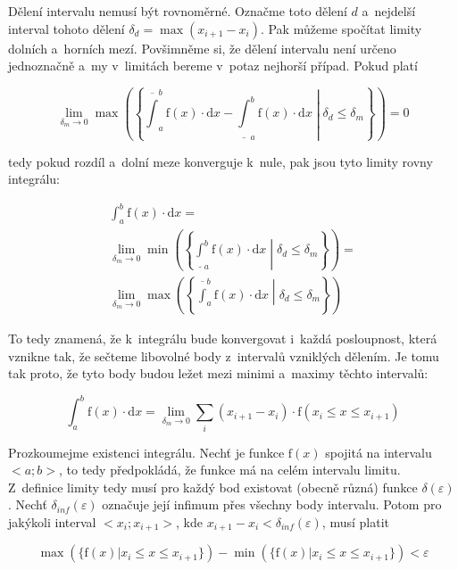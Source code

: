 Dělení intervalu nemusí být rovnoměrné. Označme toto dělení \(d\) a~nejdelší interval tohoto dělení \(\delta_d = \max(x_{i+1} - x_i)\). Pak můžeme spočítat limity dolních a~horních mezí. Povšimněme si, že dělení intervalu není určeno jednoznačně a~my v~limitách bereme v~potaz nejhorší případ. Pokud platí

\begin{equation}
\lim_{\delta_m \to 0} \max \left(\left\{\overline{\int}_a^b \mathrm{f}(x) \cdot \mathrm{d}x - \underline{\int}_a^b \mathrm{f}(x) \cdot \mathrm{d}x \middle| \delta_d \leq \delta_m \right\}\right) = 0
\end{equation}

tedy pokud rozdíl a~dolní meze konverguje k~nule, pak jsou tyto limity rovny integrálu:

\begin{equation}
\begin{split}
\int_a^b \mathrm{f}(x) \cdot \mathrm{d}x = \\
\lim_{\delta_m \to 0} \min \left(\left\{\underline{\int}_a^b \mathrm{f}(x) \cdot \mathrm{d}x \middle| \delta_d \leq \delta_m \right\}\right) = \\
\lim_{\delta_m \to 0} \max \left(\left\{\overline{\int}_a^b \mathrm{f}(x) \cdot \mathrm{d}x \middle| \delta_d \leq \delta_m \right\}\right)
\end{split}
\end{equation}

To tedy znamená, že k~integrálu bude konvergovat i~každá posloupnost, která vznikne tak, že sečteme libovolné body z~intervalů vzniklých dělením. Je tomu tak proto, že tyto body budou ležet mezi minimi a~maximy těchto intervalů:

\begin{equation}
\label{eq:vypocet_integralu}
\int_a^b \mathrm{f}(x) \cdot \mathrm{d}x = \lim_{\delta_m \to 0} \sum_{i} (x_{i+1} - x_i) \cdot \mathrm{f}(x_i \leq x \leq x_{i+1})
\end{equation}

Prozkoumejme existenci integrálu. Nechť je funkce \(\mathrm{f}(x)\) spojitá na intervalu \(<a; b>\), to tedy předpokládá, že funkce má na celém intervalu limitu. Z~definice limity tedy musí pro každý bod existovat (obecně různá) funkce \(\delta(\varepsilon)\). Nechť \(\delta_{inf}(\varepsilon)\) označuje její infimum přes všechny body intervalu. Potom pro jakýkoli interval \(<x_i; x_{i+1}>\), kde \(x_{i+1} - x_i < \delta_{inf}(\varepsilon)\), musí platit 

\begin{equation}
\max(\{\mathrm{f}(x) | x_i \leq x \leq x_{i+1}\}) - \min(\{\mathrm{f}(x) | x_i \leq x \leq x_{i+1}\}) < \varepsilon
\end{equation}

